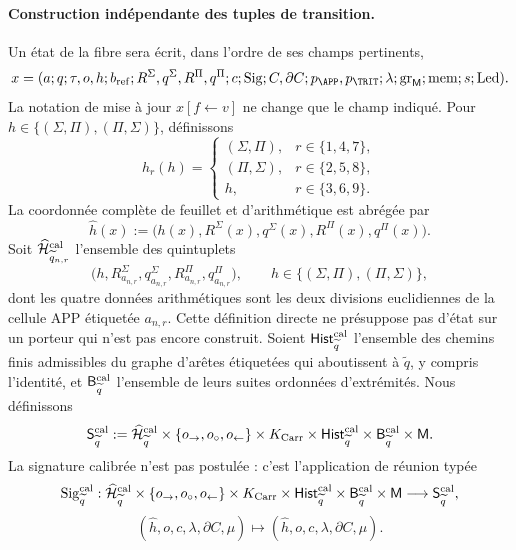 \paragraph{Construction indépendante des tuples de transition.}
Un état de la fibre sera écrit, dans l’ordre de ses champs pertinents,
\[
 x=(a;q;\tau,o,h;b_{\rm ref};
       R^\Sigma,q^\Sigma,R^\Pi,q^\Pi;c;
       \operatorname{Sig};C,\partial C;p_{\APP},p_{\TRIT};
       \lambda;\operatorname{gr}_{\mathsf M};\operatorname{mem};
       s;\operatorname{Led}).
\]
La notation de mise à jour \(x[f\leftarrow v]\) ne change que le champ
indiqué. Pour \(h\in\{(\Sigma,\Pi),(\Pi,\Sigma)\}\), définissons
\[
 h_r(h)=
 \begin{cases}
  (\Sigma,\Pi),&r\in\{1,4,7\},\\
  (\Pi,\Sigma),&r\in\{2,5,8\},\\
 h,&r\in\{3,6,9\}.
 \end{cases}
\]
La coordonnée complète de feuillet et d’arithmétique est abrégée par
\[
 \widehat h(x):=
 \bigl(h(x),R^\Sigma(x),q^\Sigma(x),R^\Pi(x),q^\Pi(x)\bigr).
\]
Soit \(\widehat{\mathcal H}^{\rm cal}_{\widetilde q_{n,r}}\) l’ensemble des
quintuplets
\[
 \bigl(h,R^\Sigma_{a_{n,r}},q^\Sigma_{a_{n,r}},
          R^\Pi_{a_{n,r}},q^\Pi_{a_{n,r}}\bigr),
 \qquad
 h\in\{(\Sigma,\Pi),(\Pi,\Sigma)\},
\]
dont les quatre données arithmétiques sont les deux divisions euclidiennes de la cellule
APP étiquetée \(a_{n,r}\). Cette définition directe ne présuppose pas d’état
sur un porteur qui n’est pas encore construit. Soient
\(\mathsf{Hist}^{\rm cal}_{\widetilde q}\) l’ensemble des chemins finis
admissibles du graphe d’arêtes étiquetées qui aboutissent à
\(\widetilde q\), y compris l’identité, et
\(\mathsf B^{\rm cal}_{\widetilde q}\) l’ensemble de leurs suites
ordonnées d’extrémités. Nous définissons
\[
 \mathsf S^{\rm cal}_{\widetilde q}:=
 \widehat{\mathcal H}^{\rm cal}_{\widetilde q}
 \times\{o_{\rightarrow},o_{\circ},o_{\leftarrow}\}
 \times K_{\rm Carr}\times
 \mathsf{Hist}^{\rm cal}_{\widetilde q}\times
 \mathsf B^{\rm cal}_{\widetilde q}\times\mathsf M .
\]
La signature calibrée n’est pas postulée : c’est l’application de réunion typée
\[
 \operatorname{Sig}^{\rm cal}_{\widetilde q}:
 \widehat{\mathcal H}^{\rm cal}_{\widetilde q}
 \times\{o_{\rightarrow},o_{\circ},o_{\leftarrow}\}
 \times K_{\rm Carr}\times
 \mathsf{Hist}^{\rm cal}_{\widetilde q}\times
 \mathsf B^{\rm cal}_{\widetilde q}\times\mathsf M
 \longrightarrow\mathsf S^{\rm cal}_{\widetilde q},
\]
\[
 (\widehat h,o,c,\lambda,\partial C,\mu)
 \longmapsto(\widehat h,o,c,\lambda,\partial C,\mu).
\]
